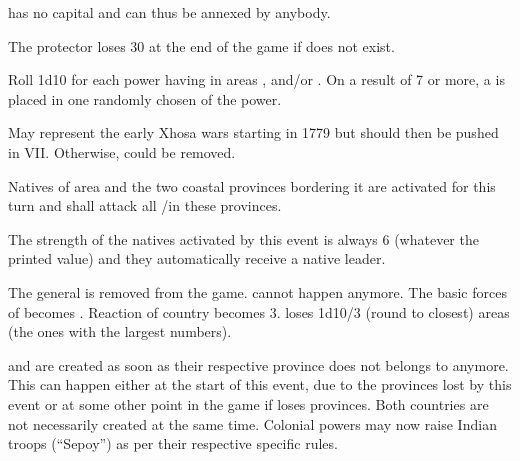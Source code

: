 \phpaix
\aparag \payscourlande has no capital and can thus be annexed by anybody.

\effetlong
\aparag The protector loses 30 \VP at the end of the game if \payscourlande
does not exist.





\phevnt
\aparag Roll 1d10 for each power having \COL in areas \granderegionCuba,
\granderegionHaiti and/or \granderegionAntilles. On a result of 7 or more, a
\REVOLT\faceplus is placed in one randomly chosen \COL of the power.





\begin{todo}
  May represent the early Xhosa wars starting in 1779 but should then be
  pushed in VII. Otherwise, could be removed.
\end{todo}

\phevnt
\aparag Natives of area \granderegionNatal and the two coastal provinces
bordering it are activated for this turn and shall attack all \COL/\TP in
these provinces.

\phadm
\aparag The strength of the natives activated by this event is always 6\LD
(whatever the printed value) and they automatically receive a native leader.





\phevnt
\aparag The general  is removed from the game.
\aparag {} cannot happen anymore.
\aparag The basic forces of \paysmogol becomes \ARMY\faceplus.
\aparag Reaction of country \paysmogol becomes 3.
\aparag \paysmogol loses 1d10/3 (round to closest) areas (the ones with the
largest numbers).

\effetlong
\aparag \paysmysore and \payshyderabad are created as soon as their respective
province does not belongs to \paysmogol anymore.
\bparag This can happen either at the start of this event, due to the
provinces lost by this event or at some other point in the game if \paysmogol
loses provinces.
\bparag Both countries are not necessarily created at the same time.
\aparag Colonial powers may now raise Indian troops (``Sepoy'') as per their
respective specific rules.



